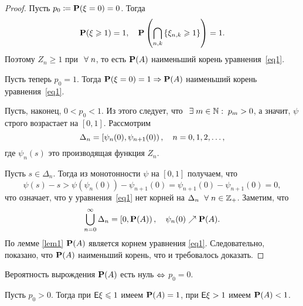 \begin{proof}
	Пусть $p_0 \coloneqq \mathbf{P}(\xi = 0) = 0$.
	Тогда
	$$
		\mathbf{P}(\xi \geqslant 1) = 1, \quad \mathbf{P}\left(\bigcap\limits_{{n,k}} \left\{ \xi_{n,k} \geqslant 1\right\} \right) = 1.
	$$
	Поэтому $Z_n \ge 1$ при $~\forall\; n$, то есть $\mathbf{P}(A)$ \td наименьший корень уравнения~\eqref{eq1}.

	Пусть теперь $p_0 = 1$.
	Тогда $\mathbf{P}(\xi = 0)=1 \Rightarrow \mathbf{P}(A)$ \td наименьший корень уравнения~\eqref{eq1}.

	Пусть, наконец, $0 < p_{0} < 1$.
	Из этого следует, что $~\exists\; m\in\mathbb{N}:\; p_m > 0$, а значит, $\psi$ строго возрастает на $[0, 1]$.
	Рассмотрим
	$$
		\Delta_n = \left[\psi_{n}(0), \psi_{n + 1}(0)\right),\quad n = 0, 1, 2 ,\ldots ,
	$$
	где $\psi_n(s)$ \td это производящая функция $Z_n$.

	Пусть $s \in \Delta_n$.
	Тогда из монотонности $\psi$ на $[0, 1]$ получаем, что
	$$
		\psi(s) - s > \psi(\psi_n(0)) - \psi_{n + 1}(0)  =  \psi_{n + 1}(0) - \psi_{n + 1}(0) = 0,
	$$
	что означает, что у уравнения~\eqref{eq1} нет корней на $\Delta_n \; ~\forall\; n \in \mathbb{Z}_{+}$.
	Заметим, что
	$$
		\bigcup\limits_{n=0}^{\infty} \Delta_n = \left[0, \mathbf{P}(A)\right), \quad \psi_n(0) \nearrow \mathbf{P}(A).
	$$
	По лемме \ref{lem1} $\mathbf{P}(A)$ является корнем уравнения \eqref{eq1}.
	Следовательно, показано, что $\mathbf{P}(A)$ \td наименьший корень, что и требовалось доказать.
\end{proof}

\begin{theorem}
	\begin{points}{0}
		\item\label{firth} Вероятность вырождения $\mathbf{P}(A)$ есть нуль $\Leftrightarrow$ $p_{0} = 0$.
		\item\label{secth} Пусть $p_{0} > 0$.
			Тогда при $\mathsf{E} \xi \leqslant 1$ имеем $\mathbf{P} (A) = 1$,
			при $\mathsf{E} \xi > 1$ имеем $\mathbf{P}(A) < 1$.
	\end{points}
\end{theorem}

